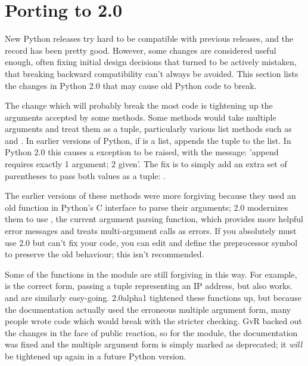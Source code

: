 \documentclass{howto}
\begin{document}


\section{Porting to 2.0}

New Python releases try hard to be compatible with previous releases,
and the record has been pretty good.  However, some changes are
considered useful enough, often fixing initial design decisions that
turned to be actively mistaken, that breaking backward compatibility
can't always be avoided.  This section lists the changes in Python 2.0
that may cause old Python code to break.

The change which will probably break the most code is tightening up
the arguments accepted by some methods.  Some methods would take
multiple arguments and treat them as a tuple, particularly various
list methods such as  and .
In earlier versions of Python, if  is a list,  appends the tuple  to the list.  In Python 2.0 this
causes a  exception to be raised, with the
message: 'append requires exactly 1 argument; 2 given'.  The fix is to
simply add an extra set of parentheses to pass both values as a tuple: 
.

The earlier versions of these methods were more forgiving because they
used an old function in Python's C interface to parse their arguments;
2.0 modernizes them to use , the current
argument parsing function, which provides more helpful error messages
and treats multi-argument calls as errors.  If you absolutely must use
2.0 but can't fix your code, you can edit 
and define the preprocessor symbol  to
preserve the old behaviour; this isn't recommended.

Some of the functions in the  module are still
forgiving in this way.  For example,  is the correct form, passing a tuple representing
an IP address, but  also
works.  and  are
similarly easy-going.  2.0alpha1 tightened these functions up, but
because the documentation actually used the erroneous multiple
argument form, many people wrote code which would break with the
stricter checking.  GvR backed out the changes in the face of public
reaction, so for the module, the documentation was
fixed and the multiple argument form is simply marked as deprecated;
it \emph{will} be tightened up again in a future Python version.
\end{document}
